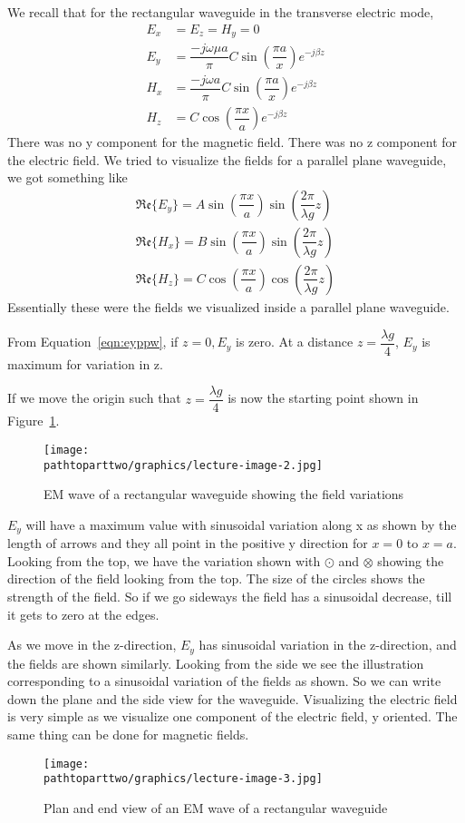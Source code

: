 We recall that for the rectangular waveguide in the transverse electric mode,
\begin{align*}
E_{x} &= E_{z} = H_{y} = 0\\
E_{y} &= \dfrac{-j\omega\mu a }{\pi} C\sin(\dfrac{\pi a}{x}) e ^{-j\beta z}\\
H_{x} &= \dfrac{-j\omega a}{\pi} C \sin(\dfrac{\pi a}{x})e^{-j\beta z} \\
H_{z} &= C\cos(\dfrac{\pi x}{a}) e^{-j\beta z}
\end{align*}
There was no y component for the magnetic field. There was no z component for the electric field. We tried to visualize the fields for a parallel plane waveguide, we got something like 
\begin{align}
\mathfrak{Re}\{E_{y}\} = A\sin(\dfrac{\pi x}{a})\sin(\dfrac{2\pi}{\lambda g}z)
\label{eqn:eyppw}\\
\mathfrak{Re}\{H_{x}\} = B\sin(\dfrac{\pi x}{a})\sin(\dfrac{2\pi}{\lambda g}z)\\
\mathfrak{Re}\{H_{z}\} = C\cos(\dfrac{\pi x}{a})\cos(\dfrac{2\pi}{\lambda g}z)
\end{align}
Essentially these were the fields we visualized inside a parallel plane waveguide.

From Equation~\eqref{eqn:eyppw}, if $z = 0, E_{y}$ is zero. At a distance $ z = \dfrac{\lambda g}{4}$, $E_{y}$ is maximum for variation in z.

If we move the origin such that $z = \dfrac{\lambda g}{4}$ is now the starting point shown in Figure~\ref{fig:lectureimage2}.
\begin{figure}[h]
\centering
\texttt{[image: \\pathtoparttwo/graphics/lecture-image-2.jpg]}
\label{fig:lectureimage2}
\caption{EM wave of a rectangular waveguide showing the field variations}
\end{figure}
$E_{y}$ will have a maximum value with sinusoidal variation along x as shown by the length of arrows and they all point in the positive y direction for $x = 0$ to $x = a$. Looking from the top, we have the variation shown with $\odot$ and $\otimes$ showing the direction of the field looking from the top. The size of the circles shows the strength of the field. So if we go sideways the field has a sinusoidal decrease, till it gets to zero at the edges.
 
As we move in the z-direction, $E_{y}$ has sinusoidal variation in the z-direction, and the fields are shown similarly. Looking from the side we see the illustration corresponding to a sinusoidal variation of the fields as shown. So we can write down the plane and the side view for the waveguide. Visualizing the electric field is very simple as we visualize one component of the electric field, y oriented. The same thing can be done for magnetic fields.
\begin{figure}[h]
\centering
\texttt{[image: \\pathtoparttwo/graphics/lecture-image-3.jpg]}
\label{fig:lectureimage3}
\caption{Plan and end view of an EM wave of a rectangular waveguide}
\end{figure}

